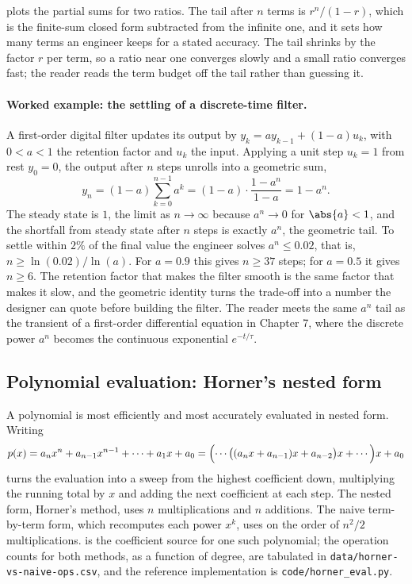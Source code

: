 

 plots the partial sums for two
ratios. The tail after $n$ terms is $r^{n}/(1 - r)$, which is the
finite-sum closed form subtracted from the infinite one, and it sets
how many terms an engineer keeps for a stated accuracy. The tail shrinks
by the factor $r$ per term, so a ratio near one converges slowly and a
small ratio converges fast; the reader reads the term budget off the
tail rather than guessing it.

\paragraph{Worked example: the settling of a discrete-time filter.} A
first-order digital filter updates its output by $y_{k} = a y_{k-1} +
(1 - a) u_{k}$, with $0 < a < 1$ the retention factor and $u_{k}$ the
input. Applying a unit step $u_{k} = 1$ from rest $y_{0} = 0$, the
output after $n$ steps unrolls into a geometric sum,
\[
y_{n} = (1 - a) \sum_{k=0}^{n-1} a^{k}
= (1 - a) \cdot \frac{1 - a^{n}}{1 - a}
= 1 - a^{n}.
\]
The steady state is $1$, the limit as $n \to \infty$ because $a^{n} \to
0$ for $\abs{a} < 1$, and the shortfall from steady state after $n$
steps is exactly $a^{n}$, the geometric tail. To settle within
$2\%$ of the final value the engineer solves $a^{n} \leq 0.02$, that
is, $n \geq \ln(0.02)/\ln(a)$. For $a = 0.9$ this gives $n \geq 37$
steps; for $a = 0.5$ it gives $n \geq 6$. The retention factor that
makes the filter smooth is the same factor that makes it slow, and the
geometric identity turns the trade-off into a number the designer can
quote before building the filter. The reader meets the same $a^{n}$ tail
as the transient of a first-order differential equation in Chapter 7,
where the discrete power $a^{n}$ becomes the continuous exponential
$e^{-t/\tau}$.

\subsection{Polynomial evaluation: Horner's nested form}

A polynomial is most efficiently and most accurately evaluated in
nested form. Writing
\[
p(x) = a_{n} x^{n} + a_{n-1} x^{n-1} + \cdots + a_{1} x + a_{0}
= \Bigl(\cdots\bigl((a_{n} x + a_{n-1}) x + a_{n-2}\bigr) x +
\cdots\Bigr) x + a_{0}
\]
turns the evaluation into a sweep from the highest coefficient down,
multiplying the running total by $x$ and adding the next coefficient
at each step. The nested form, Horner's method, uses $n$
multiplications and $n$ additions. The naive term-by-term form, which
recomputes each power $x^{k}$, uses on the order of $n^{2}/2$
multiplications.  is the
coefficient source for one such polynomial; the operation counts for
both methods, as a function of degree, are tabulated in
\texttt{data/horner-vs-naive-ops.csv}, and the reference
implementation is \texttt{code/horner\_eval.py}.

